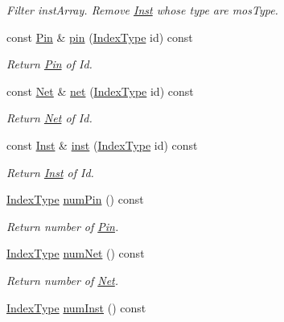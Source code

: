 \begin{DoxyCompactItemize}
\begin{DoxyCompactList}\small\item\em Filter inst\+Array. Remove \hyperlink{classInst}{Inst} whose type are mos\+Type. \end{DoxyCompactList}\item 
const \hyperlink{classPin}{Pin} \& \hyperlink{classNetlist_a0aac5b79ca1a820f0adc7b79f1b0520d}{pin} (\hyperlink{type_8h_a581e8093e28e7362f2b6937296190676}{Index\+Type} id) const
\begin{DoxyCompactList}\small\item\em Return \hyperlink{classPin}{Pin} of Id. \end{DoxyCompactList}\item 
const \hyperlink{classNet}{Net} \& \hyperlink{classNetlist_a066ebef33fd139a25a50af1a144a8361}{net} (\hyperlink{type_8h_a581e8093e28e7362f2b6937296190676}{Index\+Type} id) const
\begin{DoxyCompactList}\small\item\em Return \hyperlink{classNet}{Net} of Id. \end{DoxyCompactList}\item 
const \hyperlink{classInst}{Inst} \& \hyperlink{classNetlist_a0670a50d2a63b33b1fb72c7b0d352c11}{inst} (\hyperlink{type_8h_a581e8093e28e7362f2b6937296190676}{Index\+Type} id) const
\begin{DoxyCompactList}\small\item\em Return \hyperlink{classInst}{Inst} of Id. \end{DoxyCompactList}\item 
\hyperlink{type_8h_a581e8093e28e7362f2b6937296190676}{Index\+Type} \hyperlink{classNetlist_a90a41d0d2a05b8036589136916f2a27b}{num\+Pin} () const
\begin{DoxyCompactList}\small\item\em Return number of \hyperlink{classPin}{Pin}. \end{DoxyCompactList}\item 
\hyperlink{type_8h_a581e8093e28e7362f2b6937296190676}{Index\+Type} \hyperlink{classNetlist_aead543556d8cea4364a852d1bb2e3b68}{num\+Net} () const
\begin{DoxyCompactList}\small\item\em Return number of \hyperlink{classNet}{Net}. \end{DoxyCompactList}\item 
\hyperlink{type_8h_a581e8093e28e7362f2b6937296190676}{Index\+Type} \hyperlink{classNetlist_aa9b8924df39d788ba5f70f11ea083fea}{num\+Inst} () const

\end{DoxyCompactItemize}

